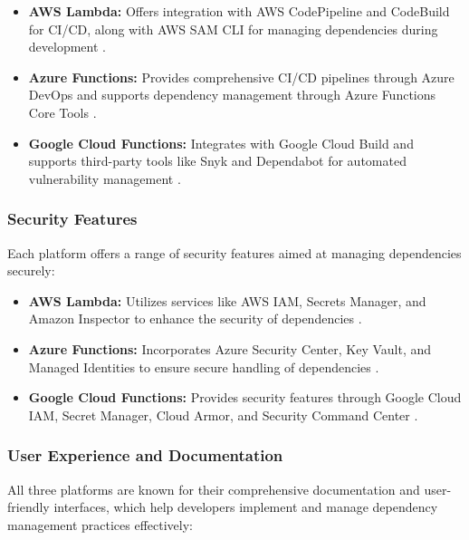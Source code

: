 \documentclass[sigconf]{acmart}
\begin{document}
\begin{itemize}
    \item \textbf{AWS Lambda:} Offers integration with AWS CodePipeline and CodeBuild for CI/CD, along with AWS SAM CLI for managing dependencies during development \cite{awsCI2023, awssam2023}.
    \item \textbf{Azure Functions:} Provides comprehensive CI/CD pipelines through Azure DevOps and supports dependency management through Azure Functions Core Tools \cite{azureDevOps2023, azureCoreTools2023}.
    \item \textbf{Google Cloud Functions:} Integrates with Google Cloud Build and supports third-party tools like Snyk and Dependabot for automated vulnerability management \cite{googleBuild2023, googlesnyk2023}.
\end{itemize}

\subsubsection{Security Features}

Each platform offers a range of security features aimed at managing dependencies securely:

\begin{itemize}
    \item \textbf{AWS Lambda:} Utilizes services like AWS IAM, Secrets Manager, and Amazon Inspector to enhance the security of dependencies \cite{awsSecurity2023, awsinspector2023}.
    \item \textbf{Azure Functions:} Incorporates Azure Security Center, Key Vault, and Managed Identities to ensure secure handling of dependencies \cite{azureSecurity2023, azureManagedIdentities2023}.
    \item \textbf{Google Cloud Functions:} Provides security features through Google Cloud IAM, Secret Manager, Cloud Armor, and Security Command Center \cite{googleSecurity2023, googleArmor2023, googleSCC2023}.
\end{itemize}

\subsubsection{User Experience and Documentation}

All three platforms are known for their comprehensive documentation and user-friendly interfaces, which help developers implement and manage dependency management practices effectively:
\end{document}
